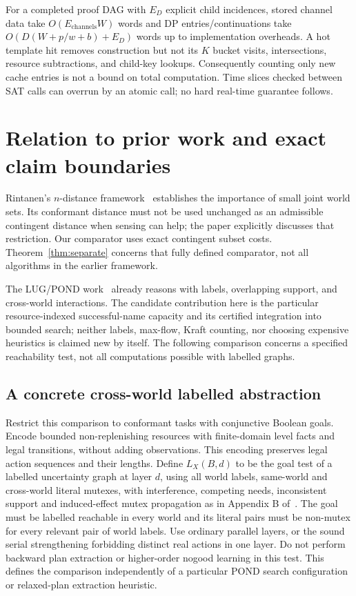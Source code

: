 \documentclass[11pt]{article}
\theoremstyle{definition}
\begin{document}
For a completed proof DAG with $E_D$ explicit child incidences, stored channel
data take $O(E_{\mathrm{channels}}W)$ words and DP entries/continuations take
$O(D(W+p/w+b)+E_D)$ words up to implementation overheads. A hot template hit
removes construction but not its $K$ bucket visits, intersections, resource
subtractions, and child-key lookups. Consequently counting only new cache
entries is not a bound on total computation. Time slices checked between SAT
calls can overrun by an atomic call; no hard real-time guarantee follows.

\section{Relation to prior work and exact claim boundaries}
Rintanen's $n$-distance framework~\cite{rintanen} establishes the importance of
small joint world sets. Its conformant distance must not be used unchanged as
an admissible contingent distance when sensing can help; the paper explicitly
discusses that restriction. Our comparator uses exact contingent subset costs.
Theorem~\ref{thm:separate} concerns that fully defined comparator, not all
algorithms in the earlier framework.

The LUG/POND work~\cite{bryce} already reasons with labels, overlapping support,
and cross-world interactions. The candidate contribution here is the particular
resource-indexed successful-name capacity and its certified integration into
bounded search; neither labels, max-flow, Kraft counting, nor choosing expensive
heuristics is claimed new by itself. The following comparison concerns a
specified reachability test, not all computations possible with labelled graphs.

\subsection{A concrete cross-world labelled abstraction}
Restrict this comparison to conformant tasks with conjunctive Boolean goals.
Encode bounded non-replenishing resources with finite-domain level facts and
legal transitions, without adding observations. This encoding preserves legal
action sequences and their lengths. Define $L_X(B,d)$ to be the goal test of a
labelled uncertainty graph at layer $d$, using all world labels, same-world and
cross-world literal mutexes, with interference, competing needs, inconsistent
support and induced-effect mutex propagation as in Appendix B of~\cite{bryce}.
The goal must be labelled reachable in every world and its literal pairs must
be non-mutex for every relevant pair of world labels. Use ordinary parallel
layers, or the sound serial strengthening forbidding distinct real actions
in one layer. Do not perform backward plan extraction or higher-order nogood
learning in this test. This defines the comparison independently of a particular
POND search configuration or relaxed-plan extraction heuristic.
\end{document}
